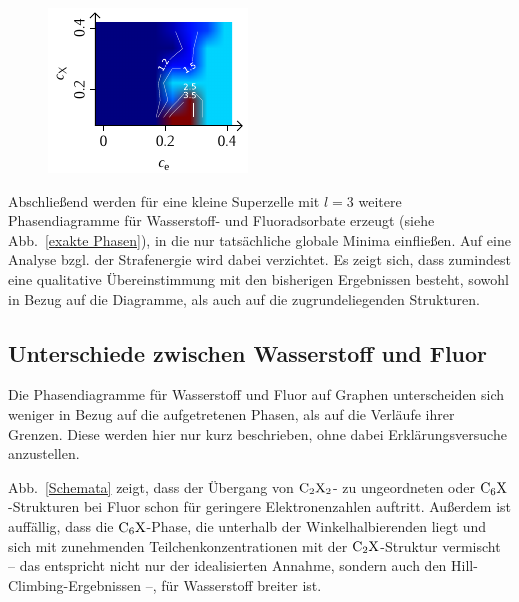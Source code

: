 \documentclass[a4paper, 10pt, twoside, openany]{book} %
\begin{document}
\begin{figure}[b]
		\hfill
		\begin{minipage}[t]{0.31\textwidth}
			\includegraphics[width=\textwidth]{Abbildungen/Phasendiagramme/Exakt/F_D.pdf}
			\label{FDx}
		\end{minipage}
	\end{figure}
	Abschließend werden für eine kleine Superzelle mit $l = 3$ weitere Phasendiagramme für Wasserstoff- und Fluoradsorbate erzeugt (siehe Abb.~\ref{exakte Phasen}), in die nur tatsächliche globale Minima einfließen. Auf eine Analyse bzgl. der Strafenergie wird dabei verzichtet. Es zeigt sich, dass zumindest eine qualitative Übereinstimmung mit den bisherigen Ergebnissen besteht, sowohl in Bezug auf die Diagramme, als auch auf die zugrundeliegenden Strukturen.
	
	\subsection{Unterschiede zwischen Wasserstoff und Fluor}
	
	Die Phasendiagramme für Wasserstoff und Fluor auf Graphen unterscheiden sich weniger in Bezug auf die aufgetretenen Phasen, als auf die Verläufe ihrer Grenzen. Diese werden hier nur kurz beschrieben, ohne dabei Erklärungsversuche anzustellen.
	
	Abb.~\ref{Schemata} zeigt, dass der Übergang von $\rm C_2X_2$- zu ungeordneten oder $\rm C_6X$-Strukturen bei Fluor schon für geringere Elektronenzahlen auftritt. Außerdem ist auffällig, dass die $\rm C_6X$-Phase, die unterhalb der Winkelhalbierenden liegt und sich mit zunehmenden Teilchenkonzentrationen mit der $\rm C_2X$-Struktur vermischt -- das entspricht nicht nur der idealisierten Annahme, sondern auch den Hill-Climbing-Ergebnissen --, für Wasserstoff breiter ist.
	
\end{document}
